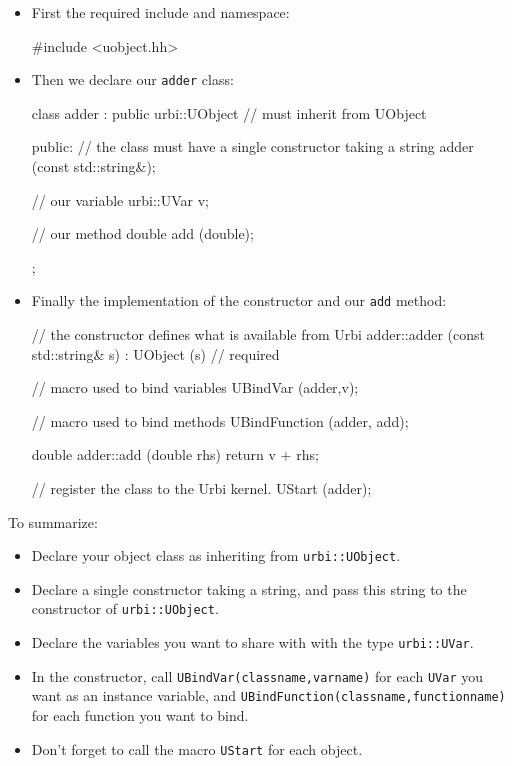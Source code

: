 \begin{itemize}
\item{First the required include and namespace:}

\begin{cxx}
#include <uobject.hh>
\end{cxx}

\item{Then we declare our \lstinline{adder} class:}
\begin{cxx}
class adder : public urbi::UObject // must inherit from UObject
{
  public:
     // the class must have a single constructor taking a string
     adder (const std::string&);

     // our variable
     urbi::UVar v;

     // our method
     double add (double);
};
\end{cxx}
\item Finally the implementation of the constructor and our
  \lstinline{add} method:
\begin{cxx}
// the constructor defines what is available from Urbi
adder::adder (const std::string& s)
  : UObject (s) // required
{

  // macro used to bind variables
  UBindVar (adder,v);

  // macro used to bind methods
  UBindFunction (adder, add);
}

double
adder::add (double rhs)
{
  return v + rhs;
}

// register the class to the Urbi kernel.
UStart (adder);
\end{cxx}
\end{itemize}

To summarize:

\begin{itemize}
\item Declare your object class as inheriting from
  \lstinline{urbi::UObject}.
\item Declare a single constructor taking a string, and pass this
  string to the constructor of \lstinline{urbi::UObject}.
\item Declare the variables you want to share with \urbi with the type
  \lstinline{urbi::UVar}.
\item In the constructor, call \lstinline{UBindVar(classname,varname)}
  for each \lstinline{UVar} you want as an instance variable, and
  \lstinline{UBindFunction(classname,functionname)} for each function
  you want to bind.
\item Don't forget to call the macro \lstinline{UStart} for each
  object.
\end{itemize}

